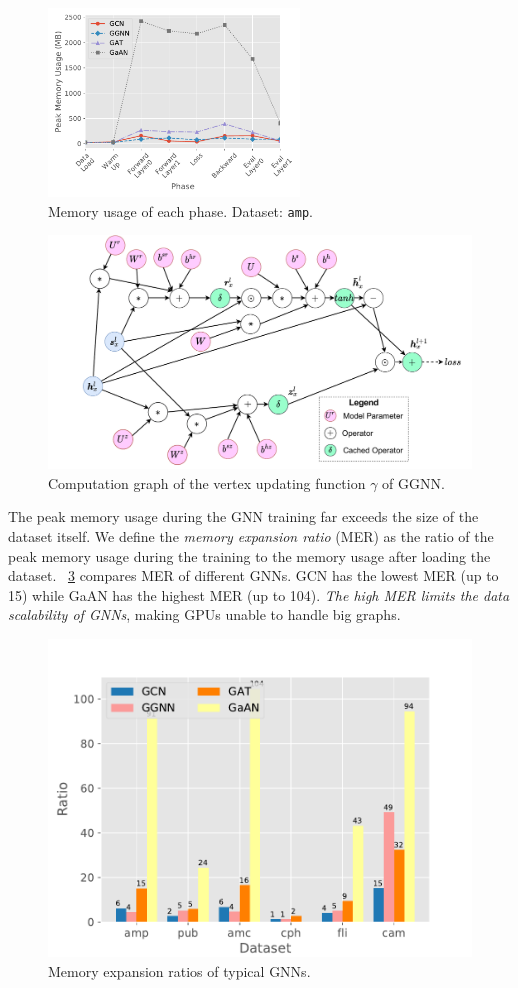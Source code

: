 \begin{figure}[h]
    \centering
    \includegraphics[height=5cm]{figs/experiments/exp_memory_usage_stage_amp.pdf}
    \caption{Memory usage of each phase. Dataset: \texttt{amp}.}
    \label{fig:exp_memory_usage_stage_amp}
\end{figure}

\begin{figure}[h]
    \centering
    \includegraphics[width=0.7\columnwidth]{figs/illustration/ggnn_vertex_func_computation_graph.pdf}
    \caption{Computation graph of the vertex updating function $\gamma$ of GGNN.}
    \label{fig:ggnn_vertex_func_computation_graph}
\end{figure}

The peak memory usage during the GNN training far exceeds the size of the dataset itself.
We define the \emph{memory expansion ratio} (MER) as the ratio of the peak memory usage during the training to the memory usage after loading the dataset.
\figurename~\ref{fig:exp_memory_expansion_ratio} compares MER of different GNNs.
GCN has the lowest MER (up to 15) while GaAN has the highest MER (up to 104).
\emph{The high MER limits the data scalability of GNNs}, making GPUs unable to handle big graphs.

\begin{figure}[h]
    \centering
    \includegraphics[width=0.5\columnwidth]{figs/experiments/exp_memory_expansion_ratio.pdf}
    \caption{Memory expansion ratios of typical GNNs.}
    \label{fig:exp_memory_expansion_ratio}
\end{figure}

